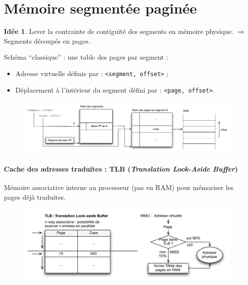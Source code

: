 \documentclass[11pt,english,french]{scrreprt}
\theoremstyle{remark}
\theoremstyle{definition}
\newtheorem*{idee*}{Idée}
\begin{document}
\section{Mémoire segmentée paginée}
\begin{idee*}
	 Lever la contrainte de contiguïté des segments en mémoire physique. $\Rightarrow$ Segments découpés en pages.
\end{idee*}

Schéma ``classique'' : une table des pages par segment : \begin{itemize}
	\item Adresse virtuelle définie par : \lstinline!<segment, offset>! ;
	\item Déplacement à l'intérieur du segment défini par : \lstinline!<page, offset>!.
\end{itemize}

\begin{figure}[h!]
	\center
	\vspace{-10pt}
	\includegraphics[scale=.6]{img/segmente-pagine}
	\vspace{-20pt} 
\end{figure}

\paragraph{Cache des adresses traduites : TLB (\emph{Translation Look-Aside Buffer})}

Mémoire associative interne au processeur (pas en RAM) pour mémoriser les pages déjà traduites.

\begin{figure}[h!]
	\center
	\vspace{-10pt}
	\includegraphics[scale=.85]{img/TLB}
\end{figure}
\end{document}
